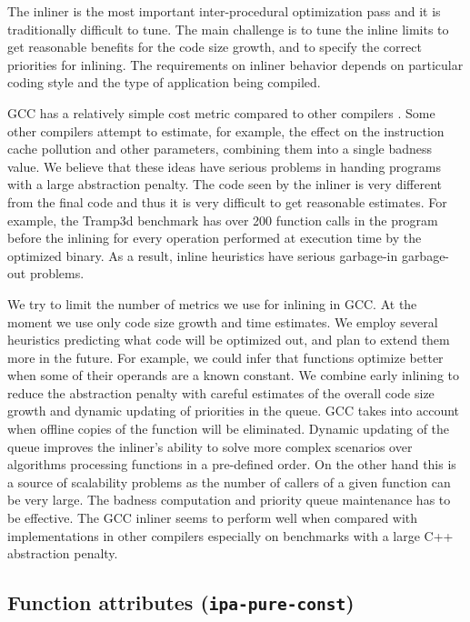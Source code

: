 \documentclass[final]{ols}
\begin{document}
The inliner is the most important inter-procedural optimization pass and it is
traditionally difficult to tune.  The main challenge is to tune the inline
limits to get reasonable benefits for the code size growth, and to specify the
correct priorities for inlining. The requirements on inliner behavior depends
on particular coding style and the type of application being compiled.

 GCC has a relatively simple cost metric compared to
other compilers \cite{HP, Zhao}.  Some other compilers attempt to estimate, for
example, the effect on the instruction cache pollution and other parameters, combining
them into a single badness value.  We believe that these ideas have serious
problems in handing programs with a large abstraction penalty. The code seen by the
inliner is very different from the final code and thus it is very difficult to
get reasonable estimates.  For example, the Tramp3d benchmark has over 200
function calls in the program before the inlining for every operation performed
at execution time by the optimized binary.  As a result, inline heuristics have
serious garbage-in garbage-out problems.

We try to limit the number of metrics we use for inlining in GCC.  At the
moment we use only code size growth and time estimates. We employ several
heuristics predicting what code will be optimized out, and plan to extend them
more in the future. For example, we could infer that functions optimize better
when some of their operands are a known constant. We combine early inlining to
reduce the abstraction penalty with careful estimates of the overall code size
growth and dynamic updating of priorities in the queue. GCC takes into account
when offline copies of the function will be eliminated.   Dynamic updating of
the queue improves the inliner's ability to solve more complex scenarios over
algorithms processing functions in a pre-defined order. On the other hand this
is a source of scalability problems as the number of callers of a given
function can be very large.  The badness computation and priority queue
maintenance has to be effective.  The GCC inliner seems to perform well when
compared with implementations in other compilers especially on benchmarks with
a large C++ abstraction penalty.

\subsection{Function attributes ({\tt ipa-pure-const})}
\end{document}
